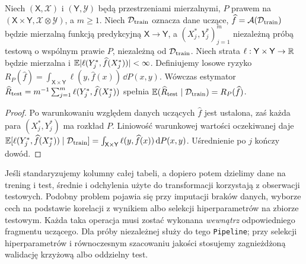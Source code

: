 \begin{stwierdzenie}
\label{prop:test-unbiased}
Niech $(\mathsf X,\mathcal X)$ i $(\mathsf Y,\mathcal Y)$ będą przestrzeniami mierzalnymi, $P$ prawem na $(\mathsf X\times\mathsf Y,\mathcal X\otimes\mathcal Y)$, a $m\ge1$. Niech $\mathcal D_{\rm train}$ oznacza dane uczące, $\widehat f=\mathcal A(\mathcal D_{\rm train})$ będzie mierzalną funkcją predykcyjną $\mathsf X\to\mathsf Y$, a $(X_j^*,Y_j^*)_{j=1}^m$ niezależną próbą testową o wspólnym prawie $P$, niezależną od $\mathcal D_{\rm train}$. Niech strata $\ell:\mathsf Y\times\mathsf Y\to\mathbb R$ będzie mierzalna i $\mathbb E|\ell(Y_j^*,\widehat f(X_j^*))|<\infty$. Definiujemy losowe ryzyko $R_P(\widehat f)=\int_{\mathsf X\times\mathsf Y}\ell(y,\widehat f(x))\,\dd P(x,y)$. Wówczas estymator
$\widehat R_{\rm test}=m^{-1}\sum_{j=1}^m
\ell(Y_j^*,\widehat f(X_j^*))$
spełnia $\mathbb E(\widehat R_{\rm test}\mid\mathcal D_{\rm train})
=R_P(\widehat f)$.
\end{stwierdzenie}
\begin{proof}
Po warunkowaniu względem danych uczących $\widehat f$
jest ustalona, zaś każda para $(X_j^*,Y_j^*)$ ma rozkład $P$.
Liniowość warunkowej wartości oczekiwanej daje
$\mathbb E[\ell(Y_j^*,\widehat f(X_j^*))\mid\mathcal D_{\rm train}]
=\int_{\mathsf X\times\mathsf Y}\ell(y,\widehat f(x))\,\mathrm d P(x,y)$.
Uśrednienie po $j$ kończy dowód.
\end{proof}

\begin{przyklad}
Jeśli standaryzujemy kolumny całej tabeli, a dopiero potem
dzielimy dane na trening i test, średnie i odchylenia użyte
do transformacji korzystają z obserwacji testowych. Podobny
problem pojawia się przy imputacji braków danych, wyborze cech
na podstawie korelacji z wynikiem albo selekcji hiperparametrów
na zbiorze testowym. Każda taka operacja musi zostać wykonana
\emph{wewnątrz} odpowiedniego fragmentu uczącego.
Dla próby niezależnej służy do tego \texttt{Pipeline}; przy
selekcji hiperparametrów i równoczesnym szacowaniu jakości
stosujemy zagnieżdżoną walidację krzyżową albo oddzielny test.
\end{przyklad}

\begin{center}
\end{center}

